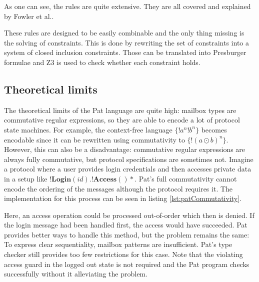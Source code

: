 As one can see, the rules are quite extensive. They are all covered and explained by Fowler et al.\cite{fowlerSpecialDeliveryProgramming2023}.

These rules are designed to be easily combinable and the only thing missing is the solving of constraints. This is done by rewriting the set of constraints into a system of closed inclusion constraints. Those can be translated into Presburger formulae and Z3 is used to check whether each constraint holds.


\subsection{Theoretical limits}

The theoretical limits of the Pat language are quite high: mailbox types are commutative regular expressions, so they are able to encode a lot of protocol state machines. For example, the context-free language $\{ !a^n !b^n \}$ becomes encodable since it can be rewritten using commutativity to $\{ !(a \odot b)^n \}$. However, this can also be a disadvantage: commutative regular expressions are always fully commutative, but protocol specifications are sometimes not. Imagine a protocol where a user provides login credentials and then accesses private data in a setup like $!\textbf{Login}(id).!\textbf{Access}()*$. Pat's full commutativity cannot encode the ordering of the messages although the protocol requires it. The implementation for this process can be seen in listing \ref{lst:patCommutativity}.

Here, an access operation could be processed out-of-order which then is denied. If the login message had been handled first, the access would have succeeded. Pat provides better ways to handle this method, but the problem remains the same: To express clear sequentiality, mailbox patterns are insufficient. Pat's type checker still provides too few restrictions for this case. Note that the violating access guard in the logged out state is not required and the Pat program checks successfully without it alleviating the problem.

